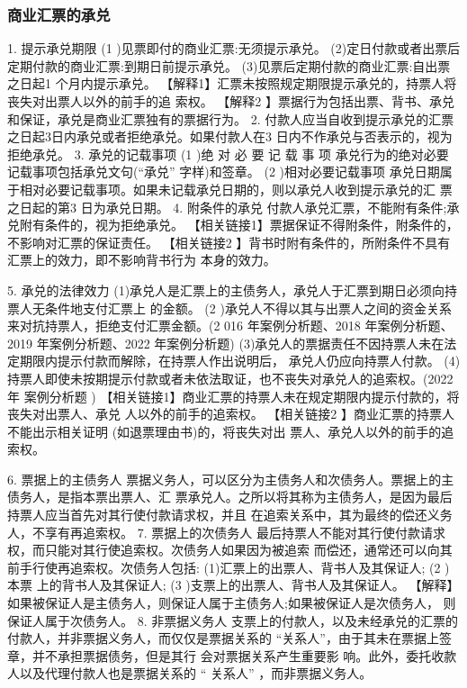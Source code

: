 \documentclass[UTF8,12pt]{ctexart}
\numberwithin{equation}{section} %
\numberwithin{figure}{section}
\numberwithin{table}{section}
\begin{document}
	\subsubsection{商业汇票的承兑} 
	1. 提示承兑期限
	(1 )见票即付的商业汇票:无须提示承兑。 (2)定日付款或者出票后定期付款的商业汇票:到期日前提示承兑。 (3)见票后定期付款的商业汇票:自出票之日起1 个月内提示承兑。
	【解释1】汇票未按照规定期限提示承兑的，持票人将丧失对出票人以外的前手的追 索权。
	【解释2 】票据行为包括出票、背书、承兑和保证，承兑是商业汇票独有的票据行为。
	2. 付款人应当自收到提示承兑的汇票之日起3日内承兑或者拒绝承兑。如果付款人在3 日内不作承兑与否表示的，视为拒绝承兑。
	3. 承兑的记载事项
	(1 )绝 对 必 要 记 载 事 项
	承兑行为的绝对必要记载事项包括承兑文句(“承兑” 字样)和签章。
	(2 )相对必要记载事项 承兑日期属于相对必要记载事项。如果未记载承兑日期的，则以承兑人收到提示承兑的汇 票之日起的第3 日为承兑日期。
	4. 附条件的承兑
	付款人承兑汇票，不能附有条件;承兑附有条件的，视为拒绝承兑。
	【相关链接1】票据保证不得附条件，附条件的，不影响对汇票的保证责任。 【相关链接2 】背书时附有条件的，所附条件不具有汇票上的效力，即不影响背书行为 本身的效力。
	
	5. 承兑的法律效力 (1)承兑人是汇票上的主债务人，承兑人于汇票到期日必须向持票人无条件地支付汇票上 的金额。
	(2 )承兑人不得以其与出票人之间的资金关系来对抗持票人，拒绝支付汇票金额。(2 016 年案例分析题、2018 年案例分析题、2019 年案例分析题、2022 年案例分析题) (3)承兑人的票据责任不因持票人未在法定期限内提示付款而解除，在持票人作出说明后， 承兑人仍应向持票人付款。 (4)持票人即使未按期提示付款或者未依法取证，也不丧失对承兑人的追索权。(2022 年 案例分析题 )
	【相关链接1】商业汇票的持票人未在规定期限内提示付款的，将丧失对出票人、承兑 人以外的前手的追索权。
	【相关链接2 】商业汇票的持票人不能出示相关证明 (如退票理由书)的，将丧失对出 票人、承兑人以外的前手的追索权。
	
	6. 票据上的主债务人 票据义务人，可以区分为主债务人和次债务人。票据上的主债务人，是指本票出票人、汇 票承兑人。之所以将其称为主债务人，是因为最后持票人应当首先对其行使付款请求权，并且 在追索关系中，其为最终的偿还义务人，不享有再追索权。
	7. 票据上的次债务人 最后持票人不能对其行使付款请求权，而只能对其行使追索权。次债务人如果因为被追索 而偿还，通常还可以向其前手行使再追索权。次债务人包括: (1)汇票上的出票人、背书人及其保证人;
	(2 )本票 上的背书人及其保证人;
	(3 )支票上的出票人、背书人及其保证人。 【解释】如果被保证人是主债务人，则保证人属于主债务人;如果被保证人是次债务人， 则保证人属于次债务人。
	8. 非票据义务人 支票上的付款人，以及未经承兑的汇票的付款人，并非票据义务人，而仅仅是票据关系的 “关系人”，由于其未在票据上签章，并不承担票据债务，但是其行 会对票据关系产生重要影 响。此外，委托收款人以及代理付款人也是票据关系的 “ 关系人” ，而非票据义务人。
	
\end{document}
